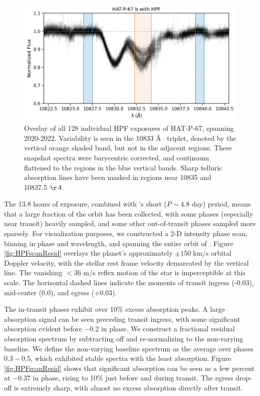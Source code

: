\documentclass[twocolumn]{aastex631}
\begin{document}
\begin{figure}
    \includegraphics[width=\linewidth]{figures/HAT_P_67b_He_spectrum.png}
    \caption{Overlay of all 128 individual HPF exposures of HAT-P-67, spanning 2020-2022. Variability is seen in the  10833 \AA~ triplet, denoted by the vertical orange shaded band, but not in the adjacent regions.  These snapshot spectra were barycentric corrected, and continuum flattened to the regions in the blue vertical bands.  Sharp telluric absorption lines have been masked in regions near 10835 and 10837.5 $\AA$.}
    \label{fig:HPFheliumOverview}
\end{figure}


The 13.8 hours of exposure, combined with 's short ($P\sim4.8$ day) period, means that a large fraction of the orbit has been collected, with some phases (especially near transit) heavily sampled, and some other out-of-transit phases sampled more sparsely. For visualization purposes, we constructed a 2-D intensity phase scan, binning in phase and wavelength, and spanning the entire orbit of .  Figure \ref{fig:HPFscanResid} overlays the planet's approximately $\pm150\;$km/s orbital Doppler velocity, with the stellar rest frame velocity demarcated by the vertical line.  The vanishing $<36$ m/s reflex motion of the star is imperceptible at this scale.  The horizontal dashed lines indicate the moments of transit ingress (-0.03), mid-center (0.0), and egress (+0.03).

The in-transit phases exhibit over 10\% excess absorption peaks.  A large absorption signal can be seen preceding transit ingress, with some significant absorption evident before $-0.2$ in phase.  We construct a fractional residual absorption spectrum by subtracting off and re-normalizing to the non-varying baseline.  We define the non-varying baseline spectrum as the average over phases $0.3-0.5$, which exhibited stable spectra with the least absorption.  Figure \ref{fig:HPFscanResid} shows that significant absorption can be seen as a few percent at $-0.37$ in phase, rising to 10\% just before and during transit.  The egress drop-off is extremely sharp, with almost no excess absorption directly after transit.
\end{document}
